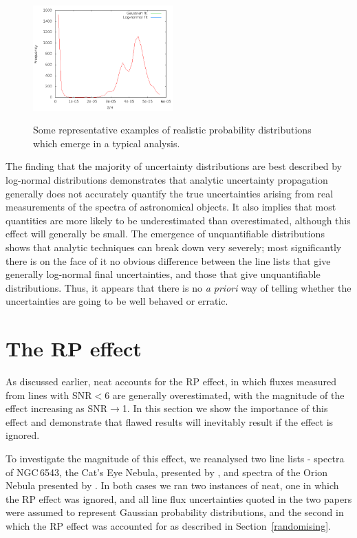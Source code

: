 \documentclass[useAMS,usenatbib]{mn2e}
\begin{document}
\begin{figure}
\includegraphics[width=0.48\textwidth]{figures/plot_binned_DdDm1-3_S_abund_CEL.png}
\label{Typical_uncertainties_images}
\caption{Some representative examples of realistic probability distributions which emerge in a typical analysis.}
\end{figure}

The finding that the majority of uncertainty distributions are best described by log-normal distributions demonstrates that analytic uncertainty propagation generally does not accurately quantify the true uncertainties arising from real measurements of the spectra of astronomical objects.  It also implies that most quantities are more likely to be underestimated than overestimated, although this effect will generally be small.  The emergence of unquantifiable distributions shows that analytic techniques can break down very severely; most significantly there is on the face of it no obvious difference between the line lists that give generally log-normal final uncertainties, and those that give unquantifiable distributions.  Thus, it appears that there is no {\it a priori} way of telling whether the uncertainties are going to be well behaved or erratic.

\section{The RP effect}

As discussed earlier, {\sc neat} accounts for the RP effect, in which fluxes measured from lines with SNR$<$6 are generally overestimated, with the magnitude of the effect increasing as SNR$\to$1.  In this section we show the importance of this effect and demonstrate that flawed results will inevitably result if the effect is ignored.

To investigate the magnitude of this effect, we reanalysed two line lists - spectra of NGC\,6543, the Cat's Eye Nebula, presented by \citet{2004MNRAS.351.1026W}, and spectra of the Orion Nebula presented by \citet{2004MNRAS.355..229E}.  In both cases we ran two instances of {\sc neat}, one in which the RP effect was ignored, and all line flux uncertainties quoted in the two papers were assumed to represent Gaussian probability distributions, and the second in which the RP effect was accounted for as described in Section~\ref{randomising}.
\end{document}
